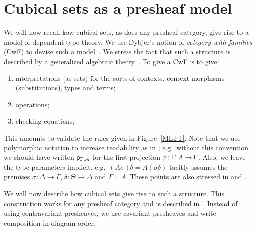 \documentclass[10pt,a4paper]{article}
\newcommand{\pp}{{\sf p}}
\begin{document}
\section{Cubical sets as a presheaf model}
\label{sec:presheaf-models}

We will now recall how cubical sets, as does any presheaf category,
give rise to a model of dependent type theory.  We use Dybjer's notion
of \emph{category with families} (CwF) to devise such a
model~\cite{Dybjer,Curien,Hofmann}.  We stress the fact that such a
structure is described by a generalized algebraic
theory~\cite{Cartmell}.  To give a CwF is to give:
\begin{enumerate}
\item interpretations (as sets) for the sorts of contexts, context
  morphisms (substitutions), types and terms;
\item operations;
\item checking equations;
\end{enumerate}
This amounts to validate the rules given in Figure~\ref{MLTT}.  Note
that we use polymorphic notation to increase readability as in
\cite{Cartmell,Dybjer}; e.g.\ without this convention we should have
written $\pp_{\Gamma, A}$ for the first projection $\pp \colon
\Gamma.A \to \Gamma$.  Also, we leave the type parameters implicit,
e.g.\ $(A \sigma) \delta = A (\sigma \delta)$ tacitly assumes the
premises $\sigma \colon \Delta \to \Gamma$, $\delta \colon \Theta \to
\Delta$ and $\Gamma \vdash A$.  These points are also stressed in
\cite[Sec.~1]{VoevodskyCMU} and \cite{Dybjer}.

We will now describe how cubical sets give rise to such a structure.
This construction works for any presheaf category and is described
in~\cite[Sec.~4]{Hofmann}.  Instead of using contravariant presheaves,
we use covariant presheaves and write composition in diagram order.
\end{document}
